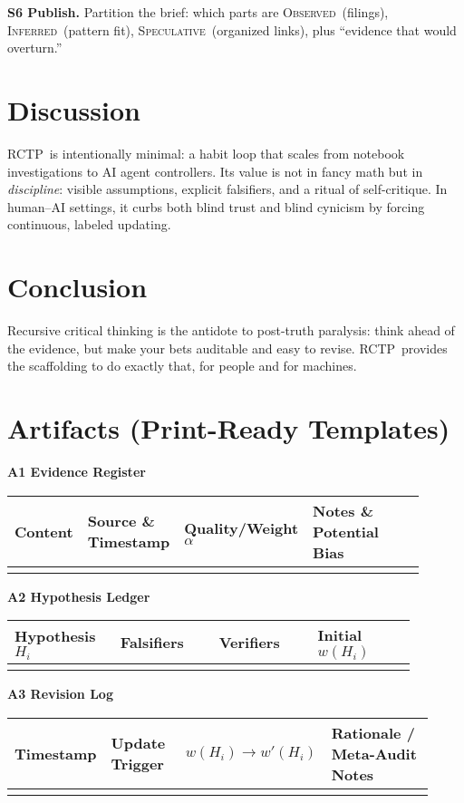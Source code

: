 \documentclass[11pt]{article}
\newcommand{\Obs}{\textsc{Observed}}
\newcommand{\Inf}{\textsc{Inferred}}
\newcommand{\Spec}{\textsc{Speculative}}
\newcommand{\rctp}{\textsc{RCTP}}
\begin{document}
\smallskip
\noindent\textbf{S6 Publish.}
Partition the brief: which parts are \Obs\ (filings), \Inf\ (pattern fit), \Spec\ (organized links), plus ``evidence that would overturn.''

\section{Discussion}
\rctp\ is intentionally minimal: a habit loop that scales from notebook investigations to AI agent controllers. Its value is not in fancy math but in \emph{discipline}: visible assumptions, explicit falsifiers, and a ritual of self-critique. In human--AI settings, it curbs both blind trust and blind cynicism by forcing continuous, labeled updating.

\section{Conclusion}
Recursive critical thinking is the antidote to post-truth paralysis: think ahead of the evidence, but make your bets auditable and easy to revise. \rctp\ provides the scaffolding to do exactly that, for people and for machines.

\section*{Artifacts (Print-Ready Templates)}
\noindent\textbf{A1 Evidence Register}\\
\begin{tabular}{@{}p{0.17\linewidth}p{0.23\linewidth}p{0.20\linewidth}p{0.30\linewidth}@{}}
\toprule
Content & Source \& Timestamp & Quality/Weight $\alpha$ & Notes \& Potential Bias \\
\midrule
 & & & \\
\bottomrule
\end{tabular}

\vspace{0.75em}
\noindent\textbf{A2 Hypothesis Ledger}\\
\begin{tabular}{@{}p{0.22\linewidth}p{0.22\linewidth}p{0.22\linewidth}p{0.22\linewidth}@{}}
\toprule
Hypothesis $H_i$ & Falsifiers & Verifiers & Initial $w(H_i)$ \\
\midrule
 & & & \\
\bottomrule
\end{tabular}

\vspace{0.75em}
\noindent\textbf{A3 Revision Log}\\
\begin{tabular}{@{}p{0.18\linewidth}p{0.20\linewidth}p{0.22\linewidth}p{0.32\linewidth}@{}}
\toprule
Timestamp & Update Trigger & $w(H_i)\rightarrow w'(H_i)$ & Rationale / Meta-Audit Notes \\
\midrule
 & & & \\
\bottomrule
\end{tabular}
\end{document}
